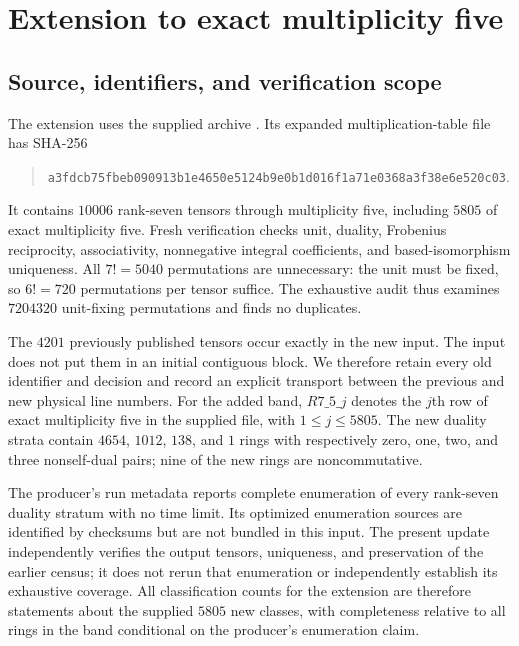 \section{Extension to exact multiplicity five}
\label{sec:m5-extension}
\subsection{Source, identifiers, and verification scope}
The extension uses the supplied archive
. Its expanded multiplication-table
file has SHA-256
\begin{quote}\small\ttfamily
\nolinkurl{a3fdcb75fbeb090913b1e4650e5124b9e0b1d016f1a71e0368a3f38e6e520c03}.
\end{quote}
It contains $10006$ rank-seven tensors through multiplicity five,
including $5805$ of exact multiplicity five. Fresh verification checks
unit, duality, Frobenius reciprocity, associativity, nonnegative integral
coefficients, and based-isomorphism uniqueness. All $7!=5040$
permutations are unnecessary: the unit must be fixed, so $6!=720$
permutations per tensor suffice. The exhaustive audit thus examines
$7204320$ unit-fixing permutations and finds no duplicates.

The $4201$ previously published tensors occur exactly in the new input.
The input does not put them in an initial contiguous block. We therefore
retain every old identifier and decision and record an explicit transport
between the previous and new physical line numbers. For the added band,
$R7\_5\_j$ denotes the $j$th row of exact multiplicity five in the supplied
file, with $1\leq j\leq5805$.
The new duality strata contain $4654$, $1012$, $138$, and $1$ rings with
respectively zero, one, two, and three nonself-dual pairs; nine of the new
rings are noncommutative.

The producer's run metadata reports complete enumeration of every
rank-seven duality stratum with no time limit. Its optimized enumeration
sources are identified by checksums but are not bundled in this input.
The present update independently verifies the output tensors, uniqueness,
and preservation of the earlier census; it does not rerun that enumeration
or independently establish its exhaustive coverage. All classification
counts for the extension are therefore statements about the supplied
$5805$ new classes, with completeness relative to all rings in the band
conditional on the producer's enumeration claim.

